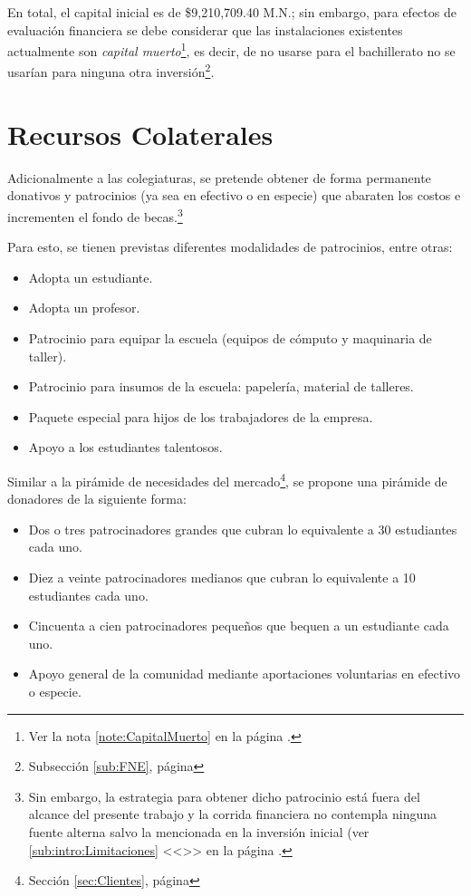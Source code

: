 En total, el capital inicial es de \$9,210,709.40 M.N.; sin embargo, para efectos de evaluación financiera se debe considerar que las instalaciones existentes actualmente son \emph{capital muerto}\footnote{Ver la nota \ref{note:CapitalMuerto} en la página \pageref{note:CapitalMuerto}.}, es decir, de no usarse para el bachillerato no se usarían para ninguna otra inversión\footnote{Subsección \ref{sub:FNE}, página \pageref{sub:FNE}}.

\section{Recursos Colaterales}
\label{sec:RecursosColaterales}

Adicionalmente a las colegiaturas, se pretende obtener de forma permanente donativos y patrocinios (ya sea en efectivo o en especie) que abaraten los costos e incrementen el fondo de becas.\footnote{Sin embargo, la estrategia para obtener dicho patrocinio está fuera del alcance del presente trabajo y la corrida financiera no contempla ninguna fuente alterna salvo la mencionada en la inversión inicial (ver \ref{sub:intro:Limitaciones} <<>> en la página \pageref{sub:intro:Limitaciones}.}

Para esto, se tienen previstas diferentes modalidades de patrocinios, entre otras:

\begin{itemize}
	\item Adopta un estudiante.
	\item Adopta un profesor.
	\item Patrocinio para equipar la escuela (equipos de cómputo y maquinaria de taller).
	\item Patrocinio para insumos de la escuela: papelería, material de talleres.
	\item Paquete especial para hijos de los trabajadores de la empresa.
	\item Apoyo a los estudiantes talentosos.
\end{itemize}

Similar a la pirámide de necesidades del mercado\footnote{Sección \ref{sec:Clientes}, página \pageref{sec:Clientes}}, se propone una pirámide de donadores de la siguiente forma:

\begin{itemize}
	\item Dos o tres patrocinadores grandes que cubran lo equivalente a 30 estudiantes cada uno.
	\item Diez a veinte patrocinadores medianos que cubran lo equivalente a 10 estudiantes cada uno.
	\item Cincuenta a cien patrocinadores pequeños que bequen a un estudiante cada uno.
	\item Apoyo general de la comunidad mediante aportaciones voluntarias en efectivo o especie.
\end{itemize}

